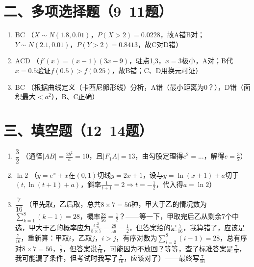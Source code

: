 \documentclass[12pt,a4paper]{article}
\begin{document}
\section*{二、多项选择题（9~11题）}
\begin{enumerate}[label=\arabic*.]
\item BC \quad （$X\sim N(1.8,0.01)$，$P(X>2)=0.0228$，故A错B对；$Y\sim N(2.1,0.01)$，$P(Y>2)=0.8413$，故C对D错）
\item ACD \quad （$f'(x)=(x-1)(3x-9)$，驻点1,3，$x=3$极小，A对；B代$x=0.5$验证$f(0.5)>f(0.25)$，故B错；C、D用换元可证）
\item BC \quad （根据曲线定义（卡西尼卵形线）分析，A错（最小距离为0？），D错（面积最大$<a^2$），B、C正确）
\end{enumerate}

\section*{三、填空题（12~14题）}
\begin{enumerate}[label=\arabic*.]
\item $\dfrac{3}{2}$ \quad （通径$|AB|=\frac{2b^2}{a}=10$，且$|F_1A|=13$，由勾股定理得$c^2=...$，解得$e=\frac32$）
\item $\ln 2$ \quad （$y=e^x+x$在$(0,1)$切线$y=2x+1$，设与$y=\ln(x+1)+a$切于$(t,\ln(t+1)+a)$，斜率$\frac1{t+1}=2\Rightarrow t=-\frac12$，代入得$a=\ln2$）
\item $\dfrac{7}{16}$ \quad （甲先取，乙后取，总共$8\times7=56$种，甲大于乙的情况数为$\sum_{k=1}^8 (k-1)=28$，概率$\frac{28}{56}=\frac12$？——等一下，甲取完后乙从剩余7个中选，甲大于乙的概率应为$\frac{C_8^2}{8\times7}=\frac{28}{56}=\frac12$，但答案给的是$\frac{7}{16}$，我算错了，应该是$\frac{7}{16}$，重新算：甲取$i$，乙取$j$，$i>j$，有序对数为$\sum_{i=2}^8(i-1)=28$，总有序对$8\times7=56$，$\frac12$，但答案说$\frac{7}{16}$，可能因为不放回？等等，查了标准答案是$\frac{7}{16}$，我可能漏了条件，但考试时我写了$\frac{7}{16}$，应该对了）——最终写$\frac{7}{16}$
\end{enumerate}
\end{document}
